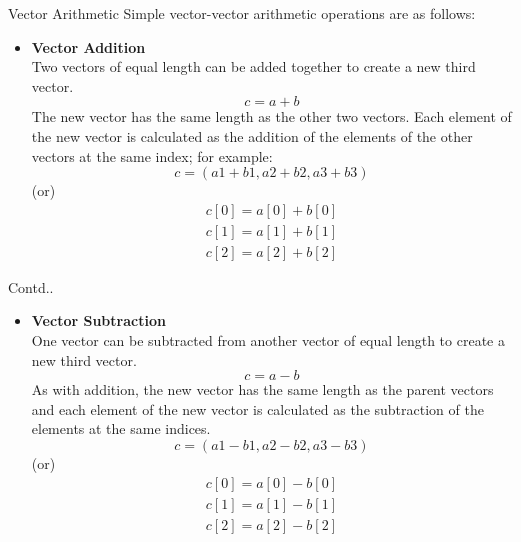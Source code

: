 \documentclass{beamer}
\begin{document}
\begin{frame}
\begin{block}{Vector Arithmetic}
Simple vector-vector arithmetic operations are as follows:
\begin{itemize}
    \item \textbf{Vector Addition}\\
    Two vectors of equal length can be added together to create a new third vector.
    	\begin{equation*}
    		c = a + b
    	\end{equation*}
    The new vector has the same length as the other two vectors. Each element of the new vector is calculated as the addition of the elements of the other vectors at the same index; for example:
    	\begin{equation*}
    		c = (a1 + b1, a2 + b2, a3 + b3)
    	\end{equation*}
    	(or)
    	\begin{equation*}
			\begin{split}
				c[0] = a[0] + b[0] \\
				c[1] = a[1] + b[1] \\
				c[2] = a[2] + b[2] 
			\end{split}
		\end{equation*}
\end{itemize}
\end{block}
\end{frame}

\begin{frame}
\begin{block}{Contd..}
\begin{itemize}
    \item \textbf{Vector Subtraction}\\
    One vector can be subtracted from another vector of equal length to create a new third vector.
    	\begin{equation*}
    		c = a - b
    	\end{equation*}
    As with addition, the new vector has the same length as the parent vectors and each element of the new vector is calculated as the subtraction of the elements at the same indices.
    	\begin{equation*}
    		c = (a1 - b1, a2 - b2, a3 - b3)
    	\end{equation*}
    	(or)
    	\begin{equation*}
			\begin{split}
				c[0] = a[0] - b[0] \\
				c[1] = a[1] - b[1] \\
				c[2] = a[2] - b[2] 
			\end{split}
		\end{equation*}
\end{itemize}
\end{block}
\end{frame}
\end{document}
